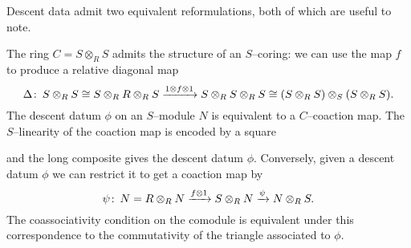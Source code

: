 Descent data admit two equivalent reformulations, both of which are useful to note.
\begin{remark}
The ring $C = S \otimes_R S$ admits the structure of an $S$--coring: we can use the map $f$ to produce a relative diagonal map \[\Delta\colon\thinspace S \otimes_R S \cong S \otimes_R R \otimes_R S \xrightarrow{1 \otimes f \otimes 1} S \otimes_R S \otimes_R S \cong (S \otimes_R S) \otimes_S (S \otimes_R S).\]  The descent datum $\phi$ on an $S$--module $N$ is equivalent to a $C$--coaction map.  The $S$--linearity of the coaction map is encoded by a square
\begin{center}
\end{center}
and the long composite gives the descent datum $\phi$.  Conversely, given a descent datum $\phi$ we can restrict it to get a coaction map by \[\psi\colon\thinspace N = R \otimes_R N \xrightarrow{f \otimes 1} S \otimes_R N \xrightarrow{\psi} N \otimes_R S.\]  The coassociativity condition on the comodule is equivalent under this correspondence to the commutativity of the triangle associated to $\phi$.
\end{remark}

